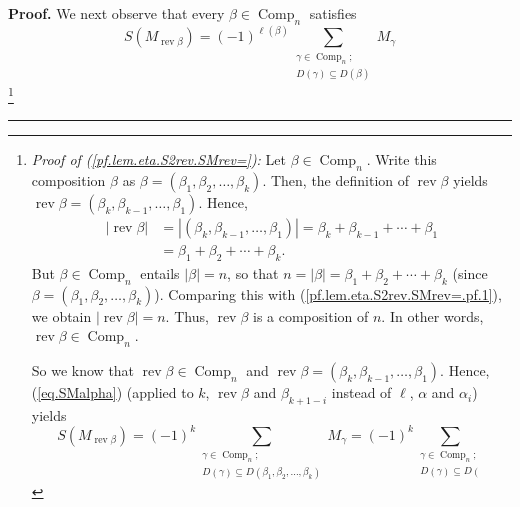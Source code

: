 \documentclass[numbers=enddot,12pt,final,onecolumn,notitlepage]{scrartcl}%
\theoremstyle{definition}
\newenvironment{proof}[1][Proof]{\noindent\textbf{#1.} }{\ \rule{0.5em}{0.5em}}
\let\sumnonlimits\sum
\renewcommand{\sum}{\sumnonlimits\limits}
\newenvironment{verlong}{}{}
\begin{document}
\begin{verlong}
\begin{proof}
We next observe that every $\beta\in\operatorname*{Comp}\nolimits_{n}$
satisfies%
\begin{equation}
S\left(  M_{\operatorname*{rev}\beta}\right)  =\left(  -1\right)
^{\ell\left(  \beta\right)  }\sum_{\substack{\gamma\in\operatorname*{Comp}%
\nolimits_{n};\\D\left(  \gamma\right)  \subseteq D\left(  \beta\right)
}}M_{\gamma} \label{pf.lem.eta.S2rev.SMrev=}%
\end{equation}
\footnote{\textit{Proof of (\ref{pf.lem.eta.S2rev.SMrev=}):} Let $\beta
\in\operatorname*{Comp}\nolimits_{n}$. Write this composition $\beta$ as
$\beta=\left(  \beta_{1},\beta_{2},\ldots,\beta_{k}\right)  $. Then, the
definition of $\operatorname*{rev}\beta$ yields $\operatorname*{rev}%
\beta=\left(  \beta_{k},\beta_{k-1},\ldots,\beta_{1}\right)  $. Hence,
\begin{align}
\left\vert \operatorname*{rev}\beta\right\vert  &  =\left\vert \left(
\beta_{k},\beta_{k-1},\ldots,\beta_{1}\right)  \right\vert =\beta_{k}%
+\beta_{k-1}+\cdots+\beta_{1}\nonumber\\
&  =\beta_{1}+\beta_{2}+\cdots+\beta_{k}. \label{pf.lem.eta.S2rev.SMrev=.pf.1}%
\end{align}
But $\beta\in\operatorname*{Comp}\nolimits_{n}$ entails $\left\vert
\beta\right\vert =n$, so that $n=\left\vert \beta\right\vert =\beta_{1}%
+\beta_{2}+\cdots+\beta_{k}$ (since $\beta=\left(  \beta_{1},\beta_{2}%
,\ldots,\beta_{k}\right)  $). Comparing this with
(\ref{pf.lem.eta.S2rev.SMrev=.pf.1}), we obtain $\left\vert
\operatorname*{rev}\beta\right\vert =n$. Thus, $\operatorname*{rev}\beta$ is a
composition of $n$. In other words, $\operatorname*{rev}\beta\in
\operatorname*{Comp}\nolimits_{n}$.
\par
So we know that $\operatorname*{rev}\beta\in\operatorname*{Comp}\nolimits_{n}$
and $\operatorname*{rev}\beta=\left(  \beta_{k},\beta_{k-1},\ldots,\beta
_{1}\right)  $. Hence, (\ref{eq.SMalpha}) (applied to $k$,
$\operatorname*{rev}\beta$ and $\beta_{k+1-i}$ instead of $\ell$, $\alpha$ and
$\alpha_{i}$) yields%
\begin{equation}
S\left(  M_{\operatorname*{rev}\beta}\right)  =\left(  -1\right)  ^{k}%
\sum_{\substack{\gamma\in\operatorname*{Comp}\nolimits_{n};\\D\left(
\gamma\right)  \subseteq D\left(  \beta_{1},\beta_{2},\ldots,\beta_{k}\right)
}}M_{\gamma}=\left(  -1\right)  ^{k}\sum_{\substack{\gamma\in
\operatorname*{Comp}\nolimits_{n};\\D\left(  \gamma\right)  \subseteq D\left(
}}
\end{equation}}
\end{proof}
\end{verlong}
\end{document}
